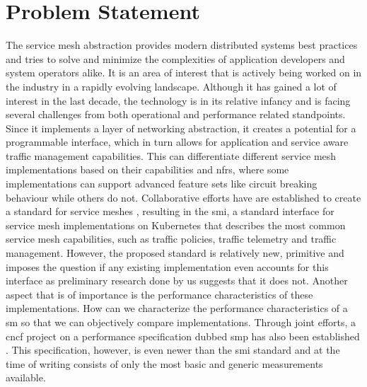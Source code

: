 \section{Problem Statement}
\label{sec:problem-statement}

The service mesh abstraction provides modern distributed systems best practices and tries to solve and minimize the complexities of application developers and system operators alike. It is an area of interest that is actively being worked on in the industry in a rapidly evolving landscape. Although it has gained a lot of interest in the last decade, the technology is in its relative infancy and is facing several challenges from both operational and performance related standpoints. Since it implements a layer of networking abstraction, it creates a potential for a programmable interface, which in turn allows for application and service aware traffic management capabilities. This can differentiate different service mesh implementations based on their capabilities and \glspl{nfr}, where some implementations can support advanced feature sets like circuit breaking behaviour while others do not. Collaborative efforts have are established to create a standard for service meshes \cite{service-mesh-interface, service-mesh-interface-spec}, resulting in the \gls{smi}, a standard interface for service mesh implementations on Kubernetes that describes the most common service mesh capabilities, such as traffic policies, traffic telemetry and traffic management. However, the proposed standard is relatively new, primitive and imposes the question if any existing implementation even accounts for this interface as preliminary research done by us suggests that it does not. Another aspect that is of importance is the performance characteristics of these implementations. How can we characterize the performance characteristics of a \gls{sm} so that we can objectively compare implementations. Through joint efforts, a \gls{cncf} project on a performance specification dubbed \gls{smp} has also been established \cite{service-mesh-performance, service-mesh-interface-spec}. This specification, however, is even newer than the \gls{smi} standard and at the time of writing consists of only the most basic and generic measurements available.

